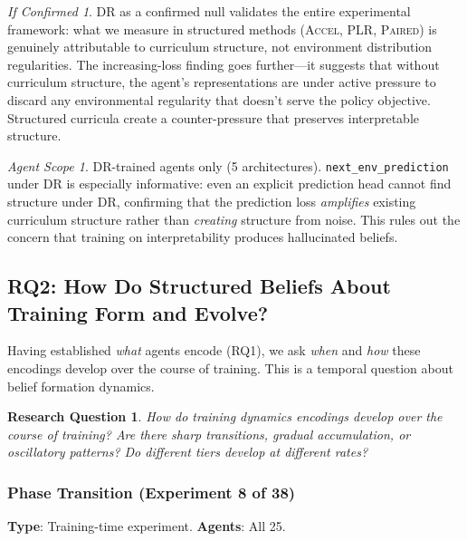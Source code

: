 \documentclass[11pt,a4paper]{article}
\newtheorem{researchq}{Research Question}[subsection]
\theoremstyle{remark}
\newtheorem*{implication}{If Confirmed}
\newtheorem*{agentscope}{Agent Scope}
\newcommand{\paired}{\textsc{Paired}}
\newcommand{\accel}{\textsc{Accel}}
\newcommand{\plr}{\textsc{PLR}}
\begin{document}
\begin{implication}
DR as a confirmed null validates the entire experimental framework: what we measure in structured methods (\accel{}, \plr{}, \paired{}) is genuinely attributable to curriculum structure, not environment distribution regularities. The increasing-loss finding goes further---it suggests that without curriculum structure, the agent's representations are under active pressure to discard any environmental regularity that doesn't serve the policy objective. Structured curricula create a counter-pressure that preserves interpretable structure.
\end{implication}

\begin{agentscope}
DR-trained agents only (5 architectures). \texttt{next\_env\_prediction} under DR is especially informative: even an explicit prediction head cannot find structure under DR, confirming that the prediction loss \textit{amplifies} existing curriculum structure rather than \textit{creating} structure from noise. This rules out the concern that training on interpretability produces hallucinated beliefs.
\end{agentscope}

\subsection{RQ2: How Do Structured Beliefs About Training Form and Evolve?}
\label{sec:rq2}

Having established \textit{what} agents encode (RQ1), we ask \textit{when} and \textit{how} these encodings develop over the course of training. This is a temporal question about belief formation dynamics.

\begin{researchq}
How do training dynamics encodings develop over the course of training? Are there sharp transitions, gradual accumulation, or oscillatory patterns? Do different tiers develop at different rates?
\end{researchq}

\subsubsection{Phase Transition (Experiment 8 of 38)}
\label{exp:phase_transition}

\textbf{Type}: Training-time experiment. \textbf{Agents}: All 25.
\end{document}
